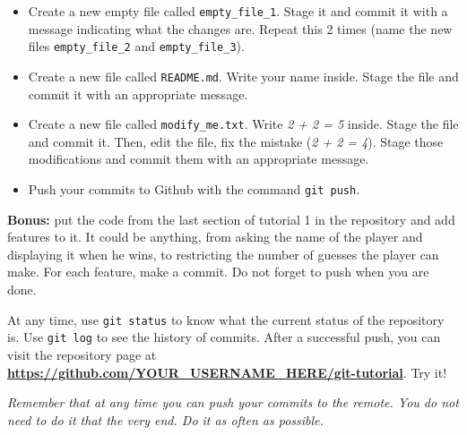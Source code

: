 \documentclass[12pt]{article}
\let\oldhref\href
\renewcommand{\href}[2]{\oldhref{#1}{\bfseries#2}}
\begin{document}
\begin{itemize}
	\item Create a new empty file called \texttt{empty\_file\_1}. Stage it and commit it with a message indicating what the changes are. Repeat this 2 times (name the new files \texttt{empty\_file\_2} and \texttt{empty\_file\_3}).
	\item Create a new file called \texttt{README.md}. Write your name inside. Stage the file and commit it with an appropriate message.
	\item Create a new file called \texttt{modify\_me.txt}. Write \textit{2 + 2 = 5} inside. Stage the file and commit it. Then, edit the file, fix the mistake (\textit{2 + 2 = 4}). Stage those modifications and commit them with an appropriate message.
	\item Push your commits to Github with the command \texttt{git push}.
\end{itemize}

\textbf{Bonus:} put the code from the last section of tutorial 1 in the repository and add features to it. It could be anything, from asking the name of the player and displaying it when he wins, to restricting the number of guesses the player can make. For each feature, make a commit. Do not forget to push when you are done.

At any time, use \texttt{git status} to know what the current status of the repository is. Use \texttt{git log} to see the history of commits.
After a successful push, you can visit the repository page at \href{https://github.com/YOUR\_USERNAME\_HERE/git-tutorial}{https://github.com/YOUR\_USERNAME\_HERE/git-tutorial}. Try it!

\textit{Remember that at any time you can push your commits to the remote. You do not need to do it that the very end. Do it as often as possible.}
\end{document}
